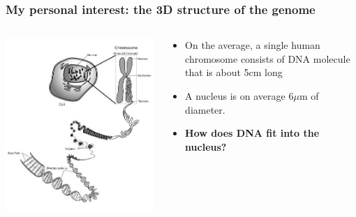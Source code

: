 \documentclass[xcolor=dvipsnames]{beamer}
\begin{document}
\begin{frame}
\frametitle{My personal interest: the 3D structure of the genome}
\begin{columns}
\begin{column}{0.45\linewidth}
\includegraphics[width=\linewidth]{images/bio_101.png}
\end{column}
\begin{column}{0.45\linewidth}
\begin{itemize}[label={$\bullet$}]
\item On the average, a single human chromosome consists of DNA molecule that is about 5cm long
\item A nucleus is on average 6$\mu$m of diameter.
\item {\bf \color{Blue} How does DNA fit into the nucleus?}
\end{itemize}
\end{column}
\end{columns}
\end{frame}
\end{document}
